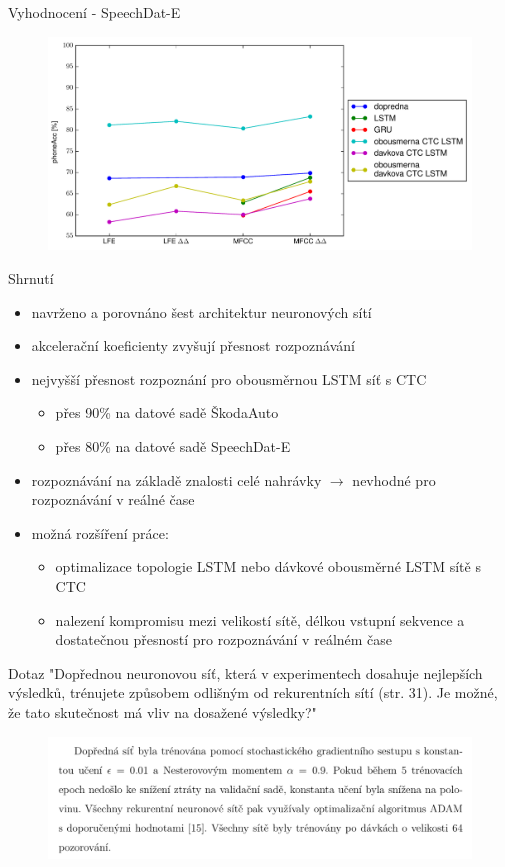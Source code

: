 \documentclass[10pt]{beamer}
\begin{document}
\begin{frame}{Vyhodnocení - SpeechDat-E}
	\begin{figure}
		\includegraphics[width=1.0\linewidth]{speechdat_results.pdf}
	\end{figure}
\end{frame}

\begin{frame}{Shrnutí}
	\begin{itemize}
		\item navrženo a porovnáno šest architektur neuronových sítí
		\item akcelerační koeficienty zvyšují přesnost rozpoznávání
		\item nejvyšší přesnost rozpoznání pro obousměrnou LSTM síť s CTC
			\begin{itemize}
				\item přes 90\% na datové sadě ŠkodaAuto
				\item přes 80\% na datové sadě SpeechDat-E
			\end{itemize}
		\item rozpoznávání na základě znalosti celé nahrávky $ \rightarrow $ nevhodné pro rozpoznávání v reálné čase
		\item možná rozšíření práce:
			\begin{itemize}
				\item optimalizace topologie LSTM nebo dávkové obousměrné LSTM sítě s CTC
				\item nalezení kompromisu mezi velikostí sítě, délkou vstupní sekvence a dostatečnou přesností pro rozpoznávání v reálném čase
			\end{itemize}
	\end{itemize}
\end{frame}

\begin{frame}{Dotaz}
	"Dopřednou neuronovou síť, která v experimentech dosahuje nejlepších výsledků, trénujete způsobem odlišným od rekurentních sítí (str. 31). Je možné, že tato skutečnost má vliv na dosažené výsledky?"
	\begin{figure}
		\includegraphics[width=1.0\linewidth]{question.png}
	\end{figure}
\end{frame}
\end{document}
